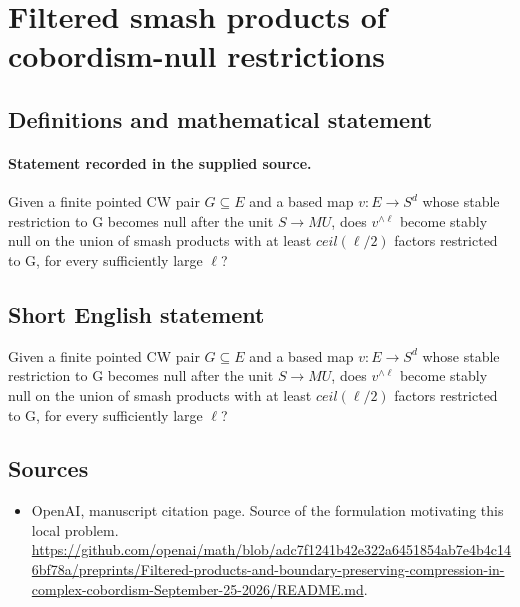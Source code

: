 \documentclass[11pt]{article}
\begin{document}
\section*{Filtered smash products of cobordism-null restrictions}\label{statement}
\subsection{Definitions and mathematical statement}
\paragraph{Statement recorded in the supplied source.}
Given a finite pointed CW pair $G\subseteq E$ and a based map $v:E\to S^d$ whose stable restriction to G becomes null after the unit $S\to MU$, does $v^{\wedge \ell }$ become stably null on the union of smash products with at least $ceil(\ell /2)$ factors restricted to G, for every sufficiently large $\ell $?
\subsection{Short English statement}
Given a finite pointed CW pair $G\subseteq E$ and a based map $v:E\to S^d$ whose stable restriction to G becomes null after the unit $S\to MU$, does $v^{\wedge \ell }$ become stably null on the union of smash products with at least $ceil(\ell /2)$ factors restricted to G, for every sufficiently large $\ell $?
\subsection{Sources}
\begin{itemize}
\item[S1] OpenAI, manuscript citation page. Source of the formulation motivating this local problem.
\url{https://github.com/openai/math/blob/adc7f1241b42e322a6451854ab7e4b4c146bf78a/preprints/Filtered-products-and-boundary-preserving-compression-in-complex-cobordism-September-25-2026/README.md}.
\end{itemize}
\end{document}
